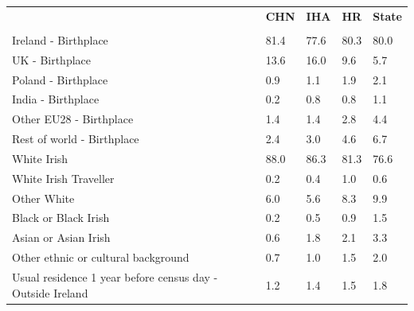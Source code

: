 \documentclass{article}
\begin{document}
\pagebreak
\begin{table}[h]	
\centering
		\begin{tabular}{KTTTT}
  \hline
& \textbf{CHN} & \textbf{IHA} & \textbf{HR}& \textbf{State}\\ 
  \hline
    \\ 
    \hline
Ireland - Birthplace & 81.4& 77.6& 80.3& 80.0\\
UK - Birthplace & 13.6& 16.0&  9.6&  5.7\\
Poland - Birthplace & 0.9& 1.1& 1.9& 2.1\\
India - Birthplace & 0.2& 0.8& 0.8& 1.1\\
Other EU28 - Birthplace & 1.4& 1.4& 2.8& 4.4\\
Rest of world - Birthplace & 2.4& 3.0& 4.6& 6.7\\
    \hline
White Irish & 88.0& 86.3& 81.3& 76.6\\
White Irish Traveller & 0.2& 0.4& 1.0& 0.6\\
Other White & 6.0& 5.6& 8.3& 9.9\\
Black or Black Irish & 0.2& 0.5& 0.9& 1.5\\
Asian or Asian Irish & 0.6& 1.8& 2.1& 3.3\\
Other ethnic or cultural background & 0.7& 1.0& 1.5& 2.0\\
    \hline
Usual residence 1 year before census day - Outside Ireland & 1.2& 1.4& 1.5& 1.8\\


\end{tabular}
\end{table}
\end{document}

